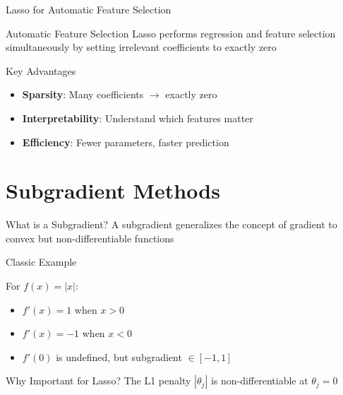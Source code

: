 \documentclass{beamer}
\begin{document}
\begin{frame}{Lasso for Automatic Feature Selection}
\begin{definitionbox}{Automatic Feature Selection}
Lasso performs regression and feature selection simultaneously by setting irrelevant coefficients to exactly zero
\end{definitionbox}

\begin{keypointsbox}{Key Advantages}
{\small
\begin{itemize}
\item \textbf{Sparsity}: Many coefficients $\rightarrow$ exactly zero
\item \textbf{Interpretability}: Understand which features matter
\item \textbf{Efficiency}: Fewer parameters, faster prediction
\end{itemize}
}
\end{keypointsbox}

\end{frame}

\section{Subgradient Methods}

\begin{frame}{What is a Subgradient?}
A subgradient generalizes the concept of gradient to convex but non-differentiable functions
\pause

\begin{examplebox}{Classic Example}
    \small{
For $f(x) = |x|$:
\begin{itemize}
\item $f'(x) = 1$ when $x > 0$
\item $f'(x) = -1$ when $x < 0$  
\item $f'(0)$ is undefined, but subgradient $\in [-1, 1]$
\end{itemize}}
\end{examplebox}
\pause

\small{
\begin{alertbox}{Why Important for Lasso?}
The L1 penalty $|\theta_j|$ is non-differentiable at $\theta_j = 0$
\end{alertbox}
}
\end{frame}
\end{document}
